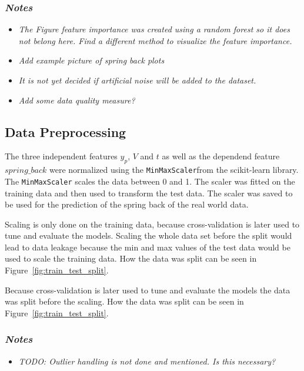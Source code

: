 \subsubsection*{\textit{Notes}}

\begin{itemize}
    \item \textit{The Figure feature importance was created using a random forest so it does not belong here. Find a different method to visualize the feature importance.}
    \item \textit{Add example picture of spring back plots}
    \item \textit{It is not yet decided if artificial noise will be added to the dataset.}
    \item \textit{Add some data quality measure?}
\end{itemize}





\subsection{Data Preprocessing}

The three independent features $y_p$, $V$ and $t$ as well as the dependend feature $spring\_back$ were normalized using the \texttt{MinMaxScaler}from the scikit-learn library. The \texttt{MinMaxScaler} scales the data between 0 and 1. The scaler was fitted on the training data and then used to transform the test data. The scaler was saved to be used for the prediction of the spring back of the real world data.

Scaling is only done on the training data, because cross-validation is later used to tune and evaluate the models. Scaling the whole data set before the split would lead to data leakage because the min and max values of the test data would be used to scale the training data.
How the data was split can be seen in Figure~\ref{fig:train_test_split}.

Because cross-validation is later used to tune and evaluate the models the data was split before the scaling. How the data was split can be seen in Figure~\ref{fig:train_test_split}.

\subsubsection*{\textit{Notes}}
\begin{itemize}
    \item \textit{TODO: Outlier handling is not done and mentioned. Is this necessary?}
\end{itemize}


